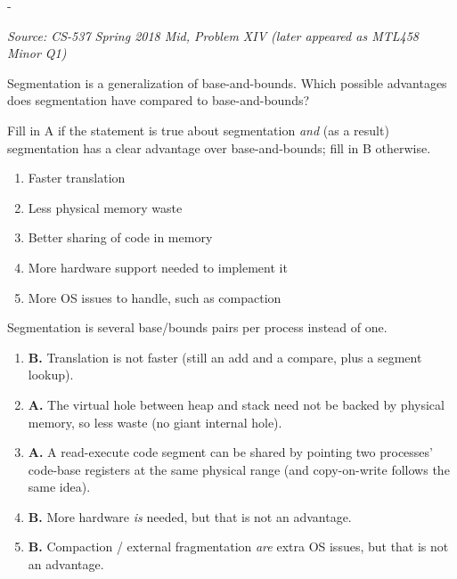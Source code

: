 \documentclass[11pt,a4paper]{article}
\makeatletter
\newcommand{\keepspace}[1]{\par\penalty-100\begingroup
  \setlength{\dimen@}{#1}\dimen@ii\pagegoal\advance\dimen@ii-\pagetotal
  \ifdim\dimen@>\dimen@ii\ifdim\dimen@ii>\z@\vfil\fi\break\fi\endgroup}
\newcounter{qn}[section]
\newenvironment{Qn}[4]{%
  \refstepcounter{qn}\keepspace{7\baselineskip}%
  \begin{tcolorbox}[qboxstyle, title={Q\thesection.\theqn\ \ [#1 \textbar\ #2]\ \ #4}]%
  {\footnotesize\color{g3}\textit{Source: #3}}\par\smallskip%
}{%
  \end{tcolorbox}%
}
\newenvironment{Sol}{%
  \begin{tcolorbox}[sboxstyle, title={Solution}]%
}{%
  \end{tcolorbox}\vspace{0.35em}%
}
\makeatother
\begin{document}
\begin{Qn}{Medium}{Lect 10}{CS-537 Spring 2018 Mid, Problem XIV (later appeared as MTL458 Minor Q1)}{Does segmentation actually beat base-and-bounds?}
Segmentation is a generalization of base-and-bounds. Which possible
advantages does segmentation have compared to base-and-bounds?

Fill in A if the statement is true about segmentation \emph{and} (as a
result) segmentation has a clear advantage over base-and-bounds; fill
in B otherwise.
\begin{enumerate}
  \item[66.] Faster translation
  \item[67.] Less physical memory waste
  \item[68.] Better sharing of code in memory
  \item[69.] More hardware support needed to implement it
  \item[70.] More OS issues to handle, such as compaction
\end{enumerate}
\end{Qn}
\begin{Sol}
Segmentation is several base/bounds pairs per process instead of one.
\begin{enumerate}
  \item[66.] \textbf{B.} Translation is not faster (still an add and a
        compare, plus a segment lookup).
  \item[67.] \textbf{A.} The virtual hole between heap and stack need
        not be backed by physical memory, so less waste (no giant
        internal hole).
  \item[68.] \textbf{A.} A read-execute code segment can be shared by
        pointing two processes' code-base registers at the same
        physical range (and copy-on-write follows the same idea).
  \item[69.] \textbf{B.} More hardware \emph{is} needed, but that is
        not an advantage.
  \item[70.] \textbf{B.} Compaction / external fragmentation \emph{are}
        extra OS issues, but that is not an advantage.
\end{enumerate}
\end{Sol}
\end{document}
